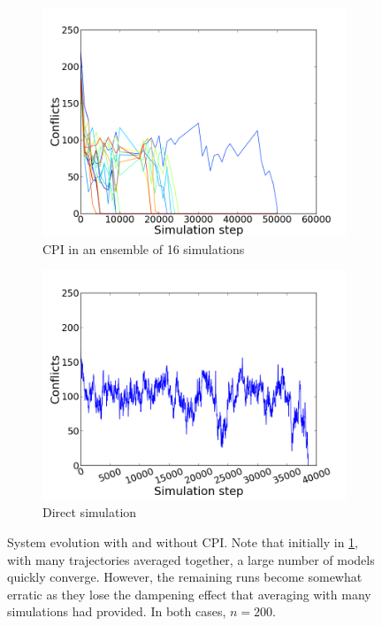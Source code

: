 \documentclass[11pt]{article}
\begin{document}
\begin{figure}[h!]
  \centering
  \begin{subfigure}{.5\textwidth}
    \centering
    \includegraphics[width=1.0\linewidth]{vmCPI16v2}
    \caption{CPI in an ensemble of 16 simulations}
    \label{fig:vmCPI}
  \end{subfigure}%
  \begin{subfigure}{.5\textwidth}
    \centering
    \includegraphics[width=1.0\linewidth]{vmSingleLongTC}
    \caption{Direct simulation}
    \label{fig:vmNoCPI}
  \end{subfigure}%
  \caption{System evolution with and without CPI. Note that initially in \ref{fig:vmCPI}, with many trajectories averaged together, a large number of models quickly converge. However, the remaining runs become somewhat erratic as they lose the dampening effect that averaging with many simulations had provided. In both cases, $n=200$.}
  \label{fig:vmResults}
\end{figure}
\end{document}
